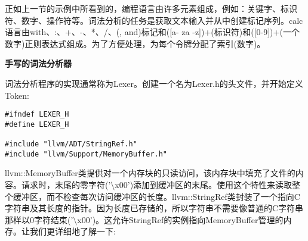 正如上一节的示例中所看到的，编程语言由许多元素组成，例如：关键字、标识符、数字、操作符等。词法分析的任务是获取文本输入并从中创建标记序列。calc语言由with、:、+、-、*、/、(, and)标记和([a- za -z])+(标识符)和([0-9])+(一个数字)正则表达式组成。为了方便处理，为每个令牌分配了索引(数字)。\par

\hspace*{\fill} \par %
\textbf{手写的词法分析器}

词法分析程序的实现通常称为Lexer。创建一个名为Lexer.h的头文件，并开始定义Token:\par

\begin{lstlisting}[caption={}]
#ifndef LEXER_H
#define LEXER_H

#include "llvm/ADT/StringRef.h"
#include "llvm/Support/MemoryBuffer.h"
\end{lstlisting}

llvm::MemoryBuffer类提供对一个内存块的只读访问，该内存块中填充了文件的内容。请求时，末尾的零字符('$\setminus$x00')添加到缓冲区的末尾。使用这个特性来读取整个缓冲区，而不检查每次访问缓冲区的长度。llvm::StringRef类封装了一个指向C字符串及其长度的指针。因为长度已存储的，所以字符串不需要像普通的C字符串那样以0字符结束('$\setminus$x00')。这允许StringRef的实例指向MemoryBuffer管理的内存。让我们更详细地了解一下:\par

